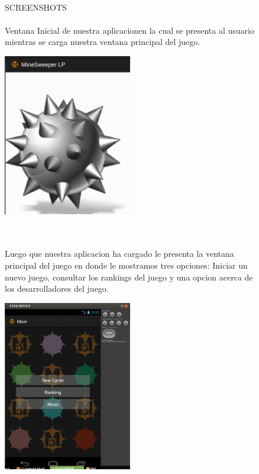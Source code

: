 \documentclass[../documentacion_buscaminas2013.tex]{subfiles}
\begin{document}
\begin{figure}[!ht]
\paragraph{ } SCREENSHOTS

\paragraph{ } Ventana Inicial de nuestra aplicacionen la cual se presenta al usuario mientras se carga nuestra ventana principal del juego.
\newline
	~\newline
	\begin{center}
		\includegraphics[width=0.5\textwidth]{./images/inicio.png}
	\end{center}

~\newline
\paragraph{ } Luego que nuestra aplicacion ha cargado le presenta la ventana principal del juego en donde le mostramos tres opciones: Iniciar un nuevo juego, consultar los rankings del juego y una opcion acerca de los desarrolladores del juego.
\newline
	~\newline
	\begin{center}
		\includegraphics[width=0.5\textwidth]{./images/inicio2.png}
	\end{center}
	

\end{figure}
\end{document}
